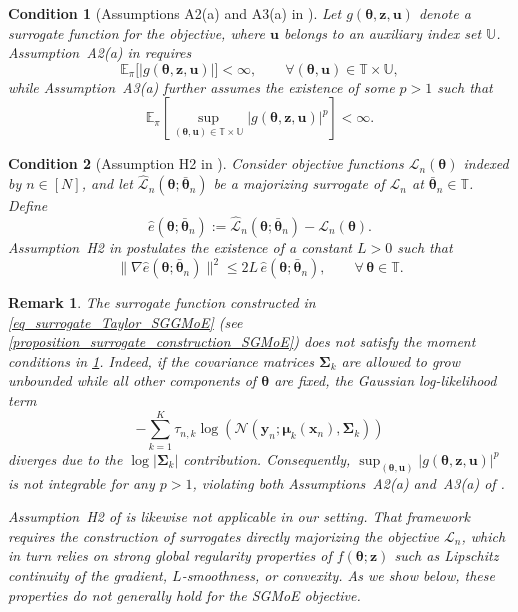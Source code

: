\documentclass{article}
\newcommand{\cN}{\mathcal{N}}
\newtheorem{remark}{Remark}
\newtheorem{condition}{Condition}
\def\PE{\mathbb{E}_\pi} %
\def\rvz{{\mathbf{z}}}
\def\vmu{{\bm{\mu}}}
\def\vtheta{{\bm{\theta}}}
\def\vu{{\bm{u}}}
\def\vx{{\bm{x}}}
\def\vy{{\bm{y}}}
\def\vz{{\bm{z}}}
\def\mSigma{{\bm{\Sigma}}}
\begin{document}
\begin{condition}[Assumptions A2(a) and A3(a) in \cite{fort_sequential_2024}]
\label{rem_Assumption_A2_A3}
Let $g(\vtheta,\vz,\vu)$ denote a surrogate function for the objective, where $\vu$ belongs to an
auxiliary index set $\mathbb{U}$. Assumption~A2(a) in \cite{fort_sequential_2024} requires
\[
\PE\big[|g(\vtheta,\rvz,\vu)|\big] < \infty,
\qquad \forall (\vtheta,\vu)\in\mathbb{T}\times\mathbb{U},
\]
while Assumption~A3(a) further assumes the existence of some $p>1$ such that
\[
\PE\!\left[\sup_{(\vtheta,\vu)\in\mathbb{T}\times\mathbb{U}}
|g(\vtheta,\rvz,\vu)|^p \right] < \infty .
\]
\end{condition}

\begin{condition}[Assumption H2 in \cite{karimi_minimization_2022}]
\label{rem_assumption_H2}
Consider objective functions $\mathcal{L}_n(\vtheta)$ indexed by $n\in[N]$, and let
$\hat{\mathcal{L}}_n(\vtheta;\bar{\vtheta}_n)$ be a majorizing surrogate of $\mathcal{L}_n$ at
$\bar{\vtheta}_n\in\mathbb{T}$. Define
\[
\hat e(\vtheta;\bar{\vtheta}_n)
:= \hat{\mathcal{L}}_n(\vtheta;\bar{\vtheta}_n) - \mathcal{L}_n(\vtheta).
\]
Assumption~H2 in \cite{karimi_minimization_2022} postulates the existence of a constant $L>0$ such
that
\[
\|\nabla \hat e(\vtheta;\bar{\vtheta}_n)\|^2
\le 2L\, \hat e(\vtheta;\bar{\vtheta}_n),
\qquad \forall\,\vtheta\in\mathbb{T}.
\]
\end{condition}

\begin{remark}
The surrogate function constructed in
\cref{eq_surrogate_Taylor_SGGMoE} (see
\cref{proposition_surrogate_construction_SGMoE}) does not satisfy the moment conditions in
\cref{rem_Assumption_A2_A3}. Indeed, if the covariance matrices $\mSigma_k$ are allowed to grow
unbounded while all other components of $\vtheta$ are fixed, the Gaussian log-likelihood term
\[
-\sum_{k=1}^K \tau_{n,k}
\log\!\left(\cN(\vy_n;\vmu_k(\vx_n),\mSigma_k)\right)
\]
diverges due to the $\log|\mSigma_k|$ contribution. Consequently,
$\sup_{(\vtheta,\vu)} |g(\vtheta,\rvz,\vu)|^p$ is not integrable for any $p>1$, violating both
Assumptions~A2(a) and~A3(a) of \cite{fort_sequential_2024}.

Assumption~H2 of \cite{karimi_minimization_2022} is likewise not applicable in our setting.
That framework requires the construction of surrogates directly majorizing the objective
$\mathcal{L}_n$, which in turn relies on strong global regularity properties of
$f(\vtheta;\vz)$ such as Lipschitz continuity of the gradient, $L$-smoothness, or convexity.
As we show below, these properties do not generally hold for the SGMoE objective.
\end{remark}
\end{document}
